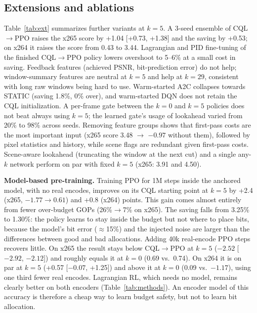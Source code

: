 \documentclass[conference]{IEEEtran}
\newcommand{\cqlppo}{CQL$\to$PPO}
\begin{document}
\subsection{Extensions and ablations}\label{sec:ext}
Table~\ref{tab:ext} summarizes further variants at $k{=}5$. A 3-seed ensemble of \cqlppo{} raises the x265 score by +1.04 [+0.73, +1.38] and the saving by +0.53; on x264 it raises the score from 0.43 to 3.44. Lagrangian and PID fine-tuning of the finished \cqlppo{} policy lowers overshoot to 5--6\% at a small cost in saving. Feedback features (achieved PSNR, bit-prediction error) do not help; window-summary features are neutral at $k{=}5$ and help at $k{=}29$, consistent with long raw windows being hard to use. Warm-started A2C collapses towards STATIC (saving 1.8\%, 0\% over), and warm-started DQN does not retain the CQL initialization. A per-frame gate between the $k{=}0$ and $k{=}5$ policies does not beat always using $k{=}5$; the learned gate's usage of lookahead varied from 20\% to 98\% across seeds. Removing feature groups shows that first-pass costs are the most important input (x265 score 3.48 $\to$ $-0.97$ without them), followed by pixel statistics and history, while scene flags are redundant given first-pass costs. Scene-aware lookahead (truncating the window at the next cut) and a single any-$k$ network perform on par with fixed $k{=}5$ (x265: 3.91 and 4.50).

\textbf{Model-based pre-training.} Training PPO for 1M steps inside the anchored model, with no real encodes, improves on its CQL starting point at $k{=}5$ by +2.4 (x265, $-1.77\to0.61$) and +0.8 (x264) points. This gain comes almost entirely from fewer over-budget GOPs (26\%$\to$7\% on x265). The saving falls from 3.25\% to 1.30\%: the policy learns to stay inside the budget but not where to place bits, because the model's bit error ($\approx$15\%) and the injected noise are larger than the differences between good and bad allocations. Adding 40k real-encode PPO steps recovers little. On x265 the result stays below \cqlppo{} at $k{=}5$ ($-2.52$ [$-2.92$, $-2.12$]) and roughly equals it at $k{=}0$ (0.69 vs.\ 0.74). On x264 it is on par at $k{=}5$ (+0.57 [$-0.07$, +1.25]) and above it at $k{=}0$ (0.09 vs.\ $-1.17$), using one third fewer real encodes. Lagrangian RL, which needs no model, remains clearly better on both encoders (Table~\ref{tab:methods}). An encoder model of this accuracy is therefore a cheap way to learn budget safety, but not to learn bit allocation.
\end{document}
